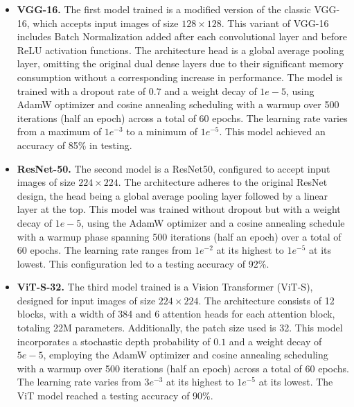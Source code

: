 \begin{itemize}
    
    \item \textbf{VGG-16.} The first model trained is a modified version of the classic VGG-16, which accepts input images of size $128\times128$. This variant of VGG-16 includes Batch Normalization added after each convolutional layer and before ReLU activation functions. The architecture head is a global average pooling layer, omitting the original dual dense layers due to their significant memory consumption without a corresponding increase in performance. The model is trained with a dropout rate of $0.7$ and a weight decay of $1e-5$, using AdamW optimizer and cosine annealing scheduling with a warmup over 500 iterations (half an epoch) across a total of 60 epochs. The learning rate varies from a maximum of $1e^{-3}$ to a minimum of $1e^{-5}$. This model achieved an accuracy of 85\% in testing.
    
    \item \textbf{ResNet-50.} The second model is a ResNet50, configured to accept input images of size $224\times224$. The architecture adheres to the original ResNet design, the head being a global average pooling layer followed by a linear layer at the top. This model was trained without dropout but with a weight decay of $1e-5$, using the AdamW optimizer and a cosine annealing schedule with a warmup phase spanning 500 iterations (half an epoch) over a total of 60 epochs. The learning rate ranges from $1e^{-2}$ at its highest to $1e^{-5}$ at its lowest. This configuration led to a testing accuracy of 92\%.

    \item \textbf{ViT-S-32.} The third model trained is a Vision Transformer (ViT-S), designed for input images of size $224\times224$. The architecture consists of 12 blocks, with a width of 384 and 6 attention heads for each attention block, totaling 22M parameters. Additionally, the patch size used is 32. This model incorporates a stochastic depth probability of $0.1$ and a weight decay of $5e-5$, employing the AdamW optimizer and cosine annealing scheduling with a warmup over 500 iterations (half an epoch) across a total of 60 epochs. The learning rate varies from $3e^{-3}$ at its highest to $1e^{-5}$ at its lowest. The ViT model reached a testing accuracy of 90\%.
\end{itemize}

